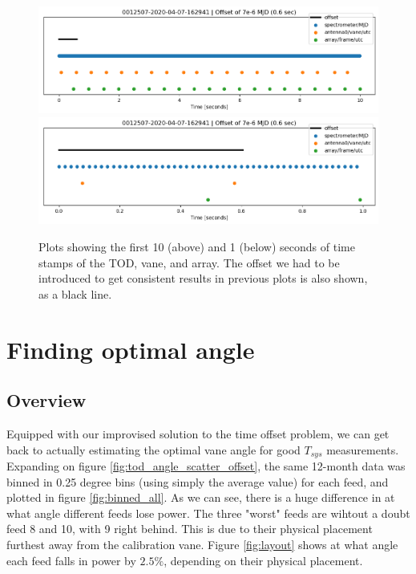 \documentclass[10pt, a4paper]{article}
\begin{document}
\begin{figure}[h!]
    \centering
    \includegraphics[scale=0.5]{../plots/times_20.png}
    \includegraphics[scale=0.5]{../plots/times_2.png}
    \caption{Plots showing the first 10 (above) and 1 (below) seconds of time stamps of the TOD, vane, and array. The offset we had to be introduced to get consistent results in previous plots is also shown, as a black line.}
    \label{fig:time}
\end{figure}




\pagebreak
\section{Finding optimal angle}
\subsection{Overview}
Equipped with our improvised solution to the time offset problem, we can get back to actually estimating the optimal vane angle for good $T_{sys}$ measurements. Expanding on figure \ref{fig:tod_angle_scatter_offset}, the same 12-month data was binned in 0.25 degree bins (using simply the average value) for each feed, and plotted in figure \ref{fig:binned_all}. As we can see, there is a huge difference in at what angle different feeds lose power. The three "worst" feeds are wihtout a doubt feed 8 and 10, with 9 right behind. This is due to their physical placement furthest away from the calibration vane. Figure \ref{fig:layout} shows at what angle each feed falls in power by $2.5\%$, depending on their physical placement. 
\end{document}
